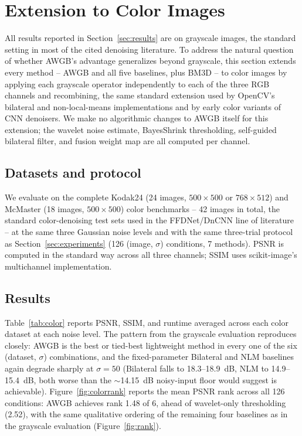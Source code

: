 \documentclass[final,3p,times,twocolumn,nopreprintline]{elsarticle}
\begin{document}
\section{Extension to Color Images}
\label{sec:color}

All results reported in Section~\ref{sec:results} are on grayscale images, the standard setting in most of the cited denoising literature. To address the natural question of whether AWGB's advantage generalizes beyond grayscale, this section extends every method -- AWGB and all five baselines, plus BM3D -- to color images by applying each grayscale operator independently to each of the three RGB channels and recombining, the same standard extension used by OpenCV's bilateral and non-local-means implementations and by early color variants of CNN denoisers. We make no algorithmic changes to AWGB itself for this extension; the wavelet noise estimate, BayesShrink thresholding, self-guided bilateral filter, and fusion weight map are all computed per channel.

\subsection{Datasets and protocol}
We evaluate on the complete Kodak24 (24 images, $500\times500$ or $768\times512$) and McMaster (18 images, $500\times500$) color benchmarks -- 42 images in total, the standard color-denoising test sets used in the FFDNet/DnCNN line of literature \cite{zhang2018ffdnet} -- at the same three Gaussian noise levels and with the same three-trial protocol as Section~\ref{sec:experiments} (126 (image, $\sigma$) conditions, 7 methods). PSNR is computed in the standard way across all three channels; SSIM uses scikit-image's multichannel implementation.

\subsection{Results}
Table~\ref{tab:color} reports PSNR, SSIM, and runtime averaged across each color dataset at each noise level. The pattern from the grayscale evaluation reproduces closely: AWGB is the best or tied-best lightweight method in every one of the six (dataset, $\sigma$) combinations, and the fixed-parameter Bilateral and NLM baselines again degrade sharply at $\sigma=50$ (Bilateral falls to 18.3--18.9~dB, NLM to 14.9--15.4~dB, both worse than the $\sim$14.15~dB noisy-input floor would suggest is achievable). Figure~\ref{fig:colorrank} reports the mean PSNR rank across all 126 conditions: AWGB achieves rank 1.48 of 6, ahead of wavelet-only thresholding (2.52), with the same qualitative ordering of the remaining four baselines as in the grayscale evaluation (Figure~\ref{fig:rank}).
\end{document}
